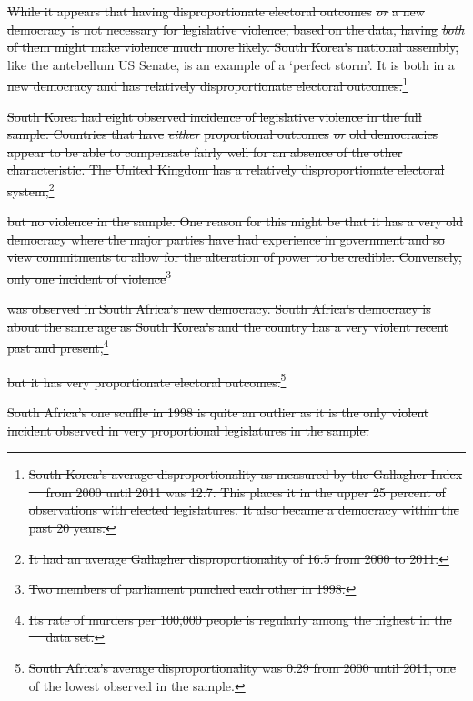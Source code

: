 \documentclass[a4paper]{article}\usepackage[]{graphicx}\usepackage[]{color}
\providecommand{\DIFdeltex}[1]{{\protect\color{red}\sout{#1}}}                      %
\providecommand{\DIFaddbegin}{} %
\providecommand{\DIFaddend}{} %
\providecommand{\DIFdelbegin}{} %
\providecommand{\DIFdelend}{} %
\providecommand{\DIFdel}[1]{\texorpdfstring{\DIFdeltex{#1}}{}} %
\begin{document}
\DIFdelbegin \DIFdel{While it appears that having disproportionate electoral outcomes }\emph{\DIFdel{or}} %
\DIFdel{a new democracy is not necessary for legislative violence, based on the data, having }\emph{\DIFdel{both}} %
\DIFdel{of them might make violence much more likely. South Korea's national assembly, like the antebellum US Senate, is an example of a `perfect storm'. It is both in a new democracy and has relatively disproportionate electoral outcomes.}\footnote{\DIFdel{South Korea’s average disproportionality as measured by the Gallagher Index \mbox{%
\citep{Gallagher1991}
}%
from 2000 until 2011 was 12.7. This places it in the upper 25 percent of observations with elected legislatures. It also became a democracy within the past 20 years.}} %
\addtocounter{footnote}{-1}%
\DIFdel{South Korea had eight observed incidence of legislative violence in the full sample. Countries that have }\emph{\DIFdel{either}} %
\DIFdel{proportional outcomes }\emph{\DIFdel{or}} %
\DIFdel{old democracies appear to be able to compensate fairly well for an absence of the other characteristic. The United Kingdom has a relatively disproportionate electoral system,}\footnote{\DIFdel{It had an average Gallagher disproportionality of 16.5 from 2000 to 2011.}} %
\addtocounter{footnote}{-1}%
\DIFdel{but no violence in the sample. One reason for this might be that it has a very old democracy where the major parties have had experience in government and so view commitments to allow for the alteration of power to be credible. Conversely, only one incident of violence}\footnote{\DIFdel{Two members of parliament punched each other in 1998.}} %
\addtocounter{footnote}{-1}%
\DIFdel{was observed in South Africa's new democracy. South Africa's democracy is about the same age as South Korea's and the country has a very violent recent past and present,}\footnote{\DIFdel{Its rate of murders per 100,000 people is regularly among the highest in the \mbox{%
\cite{UNMurder2013}
}%
data set.}} %
\addtocounter{footnote}{-1}%
\DIFdel{but it has very proportionate electoral outcomes.}\footnote{\DIFdel{South Africa’s average disproportionality was 0.29 from 2000 until 2011, one of the lowest observed in the sample.}} %
\addtocounter{footnote}{-1}%
\DIFdel{South Africa's one scuffle in 1998 is quite an outlier as it is the only violent incident observed in very proportional legislatures in the sample.
}\DIFdelend \DIFaddbegin \vspace{0.5cm}
\DIFaddend 
\end{document}
